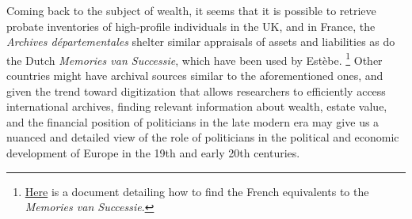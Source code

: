     Coming back to the subject of wealth, it seems that it is possible to retrieve probate inventories of high-profile individuals in the UK, and in France, the \textit{Archives départementales} shelter similar appraisals of assets and liabilities as do the Dutch \textit{Memories van Successie}, which have been used by Estèbe.\autocite{estebe1982ministres, bottomley2019returns} \footnote{\href{https://archives.cd08.fr/arkotheque/client/ad_ardennes/_depot_arko/articles/1834/tables-des-successions-et-absences-_doc.pdf}{Here} is a document detailing how to find the French equivalents to the \textit{Memories van Successie}.} Other countries might have archival sources similar to the aforementioned ones, and given the trend toward digitization that allows researchers to efficiently access international archives, finding relevant information about wealth, estate value, and the financial position of politicians in the late modern era may give us a nuanced and detailed view of the role of politicians in the political and economic development of Europe in the 19th and early 20th centuries. 

%
%
\clearpage
\printbibliography

\clearpage





\clearpage


\clearpage


\clearpage


\clearpage

